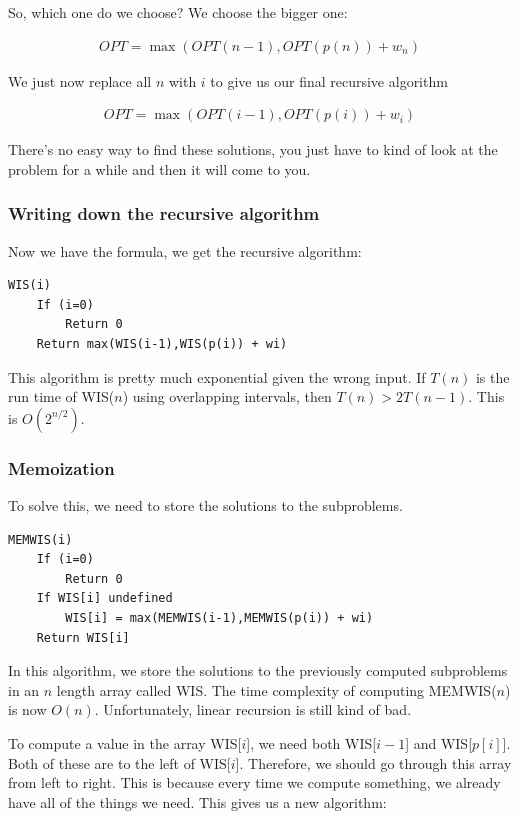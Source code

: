 \documentclass[11pt,a4paper,titlepage,dvipsnames,cmyk]{scrartcl}
\begin{document}
So, which one do we choose? We choose the bigger one:

\begin{align*}
    OPT = \max (OPT(n-1),OPT(p(n)) + w_n)
\end{align*}

We just now replace all $n$ with $i$ to give us our final recursive
algorithm

\begin{align*}
    OPT = \max (OPT(i-1),OPT(p(i)) + w_i)
\end{align*}

There's no easy way to find these solutions, you just have to kind of look
at the problem for a while and then it will come to you.

\subsubsection{Writing down the recursive algorithm}%
\label{ssub:recursive-written}
Now we have the formula, we get the recursive algorithm:

\begin{lstlisting}
WIS(i)
    If (i=0)
        Return 0
    Return max(WIS(i-1),WIS(p(i)) + wi)
\end{lstlisting}

This algorithm is pretty much exponential given the wrong input. If $T(n)$
is the run time of WIS($n$) using overlapping intervals, then $T(n) >
2T(n-1)$. This is $O(2^{n/2})$.

\subsubsection{Memoization}%
\label{ssub:Memoization}
To solve this, we need to store the solutions to the subproblems.

\begin{lstlisting}
MEMWIS(i)
    If (i=0)
        Return 0
    If WIS[i] undefined
        WIS[i] = max(MEMWIS(i-1),MEMWIS(p(i)) + wi)
    Return WIS[i]
\end{lstlisting}

In this algorithm, we store the solutions to the previously computed
subproblems in an $n$ length array called WIS. The time complexity of
computing MEMWIS($n$) is now $O(n)$. Unfortunately, linear recursion is
still kind of bad.

To compute a value in the array WIS[$i$], we need both WIS[$i-1$] and
WIS[$p[i]$]. Both of these are to the left of WIS[$i$]. Therefore, we
should go through this array from left to right. This is because every
time we compute something, we already have all of the things we need. This
gives us a new algorithm:
\end{document}
